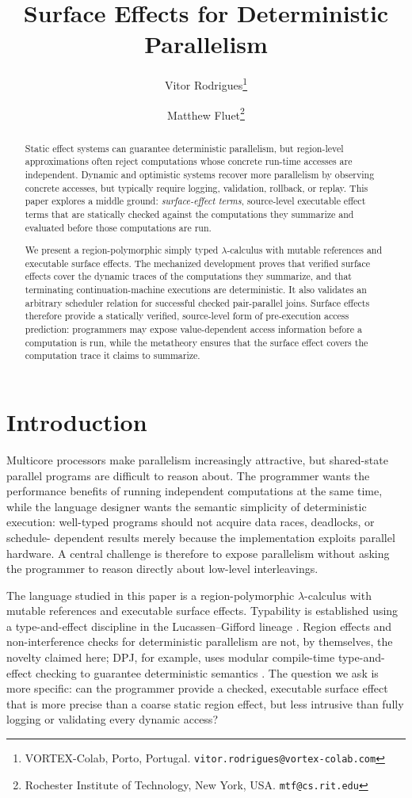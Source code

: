 \documentclass[10pt,a4paper]{article}
\title{Surface Effects for Deterministic Parallelism}
\author{Vitor Rodrigues\thanks{VORTEX-Colab, Porto, Portugal.
  \texttt{vitor.rodrigues@vortex-colab.com}}
  \and
  Matthew Fluet\thanks{Rochester Institute of Technology, New York, USA.
  \texttt{mtf@cs.rit.edu}}}
\date{}
\begin{document}
\maketitle

\begin{abstract}
Static effect systems can guarantee deterministic parallelism, but region-level
approximations often reject computations whose concrete run-time accesses are
independent. Dynamic and optimistic systems recover more parallelism by
observing concrete accesses, but typically require logging, validation,
rollback, or replay. This paper explores a middle ground: \emph{surface-effect
terms}, source-level executable effect terms that are statically checked
against the computations they summarize and evaluated before those computations
are run.

We present a region-polymorphic simply typed $\lambda$-calculus with mutable
references and executable surface effects. The mechanized development proves
that verified surface effects cover the dynamic traces of the computations
they summarize, and that terminating continuation-machine executions are
deterministic. It also validates an arbitrary scheduler relation for
successful checked pair-parallel joins. Surface effects therefore provide a
statically verified, source-level form of pre-execution access prediction:
programmers may expose
value-dependent access information before a computation is run, while the
metatheory ensures that the surface effect covers the computation trace it
claims to summarize.
\end{abstract}

\section*{Introduction}

Multicore processors make parallelism increasingly attractive, but shared-state
parallel programs are difficult to reason about. The programmer wants the
performance benefits of running independent computations at the same time, while
the language designer wants the semantic simplicity of deterministic execution:
well-typed programs should not acquire data races, deadlocks, or schedule-
dependent results merely because the implementation exploits parallel hardware.
A central challenge is therefore to expose parallelism without asking the
programmer to reason directly about low-level interleavings.

The language studied in this paper is a region-polymorphic $\lambda$-calculus
with mutable references and executable surface effects. Typability is established
using a type-and-effect discipline in the Lucassen--Gifford lineage
\citep{lucassen1988}. Region effects and non-interference checks for
deterministic parallelism are not, by themselves, the novelty claimed here; DPJ,
for example, uses modular compile-time type-and-effect checking to guarantee
deterministic semantics \citep{bocchino2009}. The question we ask is more
specific: can the programmer provide a checked, executable surface effect that is more
precise than a coarse static region effect, but less intrusive than fully
logging or validating every dynamic access?
\end{document}
